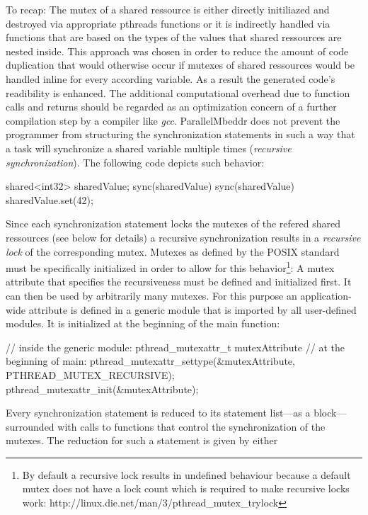 To recap: The mutex of a shared ressource is either directly initiliazed and destroyed via appropriate pthreads functions or it is indirectly handled via functions that are based on the types of the values that shared ressources are nested inside. This approach was chosen in order to reduce the amount of code duplication that would otherwise occur if mutexes of shared ressources would be handled inline for every according variable. As a result the generated code's readibility is enhanced. The additional computational overhead due to function calls and returns should be regarded as an optimization concern of a further compilation step by a compiler like \textit{gcc}.
ParallelMbeddr does not prevent the programmer from structuring the synchronization statements in such a way that a task will synchronize a shared variable multiple times (\textit{recursive synchronization}). The following code depicts such behavior:
\begin{ccode}
shared<int32> sharedValue;
sync(sharedValue) {
  sync(sharedValue) {
    sharedValue.set(42);
  }
}
\end{ccode}
Since each synchronization statement locks the mutexes of the refered shared ressources (see below for details) a recursive synchronization results in a \textit{recursive lock} of the corresponding mutex. Mutexes as defined by the POSIX standard must be specifically initialized in order to allow for this behavior\footnote{By default a recursive lock results in undefined behaviour because a default mutex does not have a lock count which is required to make recursive locks work: http://linux.die.net/man/3/pthread\_mutex\_trylock}: A mutex attribute that specifies the recursiveness must be defined and initialized first. It can then be used by arbitrarily many mutexes. 
For this purpose an application-wide attribute is defined in a generic module that is imported by all user-defined modules. It is initialized at the beginning of the main function:
\begin{ccode}
// inside the generic module:
pthread_mutexattr_t mutexAttribute
// at the beginning of main:
pthread_mutexattr_settype(&mutexAttribute, PTHREAD_MUTEX_RECURSIVE);
pthread_mutexattr_init(&mutexAttribute);
\end{ccode}
Every synchronization statement is reduced to its statement list---as a block---surrounded with calls to functions that control the synchronization of the mutexes. The reduction for such a statement is given by either

